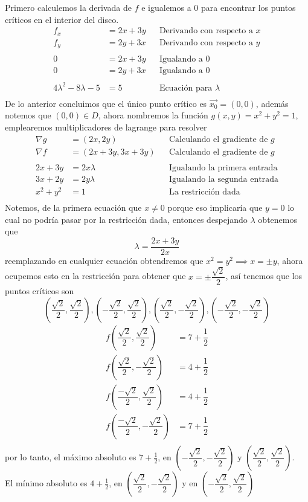 \documentclass[letterpaper]{article}
\renewcommand{\*}{\cdot}
\theoremstyle{definition}
\begin{document}
\noindent Primero calculemos la derivada de $ f $ e igualemos a 0 para encontrar los puntos críticos en el interior del disco.
\begin{align*}
	f_x &= 2x+3y &&\text{Derivando con respecto a }x\\
	f_y &= 2y+3x &&\text{Derivando con respecto a }y\\
	\\
	0 &= 2x+3y &&\text{Igualando a 0 }\\
	0 &= 2y+3x &&\text{Igualando a }0\\
	\\
	4\lambda^2 -8\lambda -5 &= 5 && \text{Ecuación para } \lambda\\
\end{align*}
De lo anterior concluimos que el único punto crítico es $ \vec{x_0} = (0,0) $, además notemos que $ (0,0) \in D $, ahora nombremos la función $ g(x,y) = x^2 + y^2 =1 $, emplearemos multiplicadores de lagrange para resolver
\begin{align*}
	\nabla g &= (2x, 2y) && \text{Calculando el gradiente de }g\\
	\nabla f &= (2x + 3y, 3x + 3y) && \text{Calculando el gradiente de }g\\
	\\
	2x + 3y &= 2x\lambda &&\text{Igualando la primera entrada}\\
	3x + 2y &= 2y\lambda &&\text{Igualando la segunda entrada}\\
	x^2 + y^2 &= 1 &&\text{La restricción dada}\\
\end{align*}
Notemos, de la primera ecuación que $ x \neq 0 $ porque eso implicaría que $ y = 0 $ lo cual no podría pasar por la restricción dada, entonces despejando $ \lambda $ obtenemos que 
\[ \lambda = \dfrac{2x + 3y}{2x} \]
reemplazando en cualquier ecuación obtendremos que $ x^2 = y^2 \implies x = \pm y $, ahora ocupemos esto en la restricción para obtener que 
$ x = \pm \dfrac{\sqrt{2}}{2} $, así tenemos que los puntos críticos son 
\[  \left( \dfrac{\sqrt{2}}{2}, \dfrac{\sqrt{2}}{2} \right), \left( -\dfrac{\sqrt{2}}{2}, \dfrac{\sqrt{2}}{2} \right), \left( \dfrac{\sqrt{2}}{2}, -\dfrac{\sqrt{2}}{2} \right), \left( -\dfrac{\sqrt{2}}{2}, -\dfrac{\sqrt{2}}{2} \right) \]
\begin{align*}
	f \left( \dfrac{\sqrt{2}}{2}, \dfrac{\sqrt{2}}{2} \right) &= 7+ \dfrac{1}{2}\\
	f \left( \dfrac{\sqrt{2}}{2},- \dfrac{\sqrt{2}}{2} \right) &= 4 + \dfrac{1}{2}\\
	f \left( \dfrac{-\sqrt{2}}{2}, \dfrac{\sqrt{2}}{2} \right) &= 4 + \dfrac{1}{2}\\
	f \left( \dfrac{-\sqrt{2}}{2},- \dfrac{\sqrt{2}}{2} \right) &= 7 + \dfrac{1}{2}\\
\end{align*}
por lo tanto, el máximo absoluto es $ 7 + \frac{1}{2} $, en $ \left( -\dfrac{\sqrt{2}}{2},- \dfrac{\sqrt{2}}{2} \right) $ y $ \left( \dfrac{\sqrt{2}}{2}, \dfrac{\sqrt{2}}{2} \right) $.\\
El mínimo absoluto es $ 4 + \frac{1}{2} $, en $ \left( \dfrac{\sqrt{2}}{2},- \dfrac{\sqrt{2}}{2} \right) $ y en $ \left( -\dfrac{\sqrt{2}}{2}, \dfrac{\sqrt{2}}{2} \right) $\\
\end{document}
